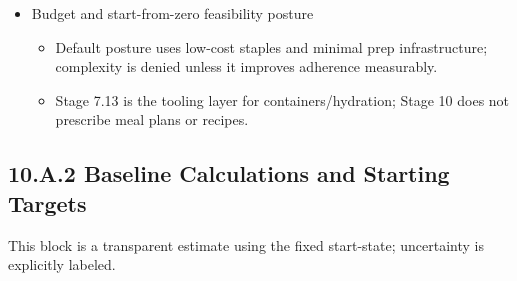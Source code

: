 \documentclass[10pt]{article}
\begin{document}
\begin{itemize}
\item Budget and start-from-zero feasibility posture
  \begin{itemize}
  \item Default posture uses low-cost staples and minimal prep infrastructure; complexity is denied unless it improves adherence measurably.
  \item Stage 7.13 is the tooling layer for containers/hydration; Stage 10 does not prescribe meal plans or recipes.
  \end{itemize}
\end{itemize}

\newpage
\subsection*{10.A.2 Baseline Calculations and Starting Targets}
{}

This block is a transparent estimate using the fixed start-state; uncertainty is explicitly labeled.
\end{document}
